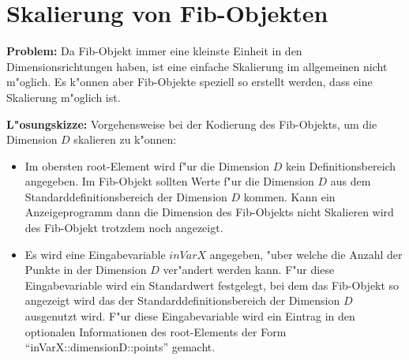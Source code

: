 


\section{Skalierung von Fib-Objekten}

\bigskip\noindent
\textbf{Problem:}
Da Fib-Objekt immer eine kleinste Einheit in den Dimensionsrichtungen haben, ist eine einfache Skalierung im allgemeinen nicht m"oglich. Es k"onnen aber Fib-Objekte speziell so erstellt werden, dass eine Skalierung m"oglich ist.


\bigskip\noindent
\textbf{L"osungskizze:}
Vorgehensweise bei der Kodierung des Fib-Objekts, um die Dimension $D$ skalieren zu k"onnen:
\begin{itemize}
 \item Im obersten root-Element wird f"ur die Dimension $D$ kein Definitionsbereich angegeben. Im Fib-Objekt sollten Werte f"ur die Dimension $D$ aus dem Standarddefinitionsbereich der Dimension $D$ kommen. Kann ein Anzeigeprogramm dann die Dimension des Fib-Objekts nicht Skalieren wird des Fib-Objekt trotzdem noch angezeigt.
 \item Es wird eine Eingabevariable $inVarX$ angegeben, "uber welche die Anzahl der Punkte in der Dimension $D$ ver"andert werden kann. F"ur diese Eingabevariable wird ein Standardwert festgelegt, bei dem das Fib-Objekt so angezeigt wird das der Standarddefinitionsbereich der Dimension $D$ ausgenutzt wird. F"ur diese Eingabevariable wird ein Eintrag in den optionalen Informationen des root-Elements der Form ``inVarX::\-dimensionD::\-points'' gemacht.
\end{itemize}















